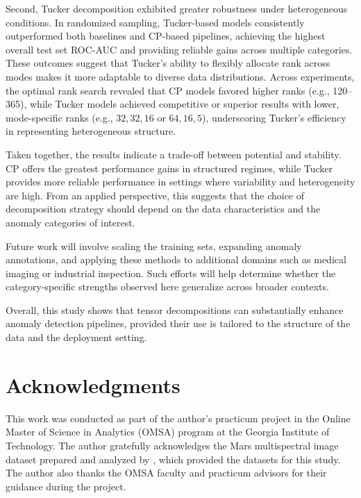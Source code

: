\documentclass[11pt]{article}
\begin{document}
Second, Tucker decomposition exhibited greater robustness under heterogeneous conditions. In randomized sampling, Tucker-based models consistently outperformed both baselines and CP-based pipelines, achieving the highest overall test set ROC-AUC and providing reliable gains across multiple categories. These outcomes suggest that Tucker’s ability to flexibly allocate rank across modes makes it more adaptable to diverse data distributions. Across experiments, the optimal rank search revealed that CP models favored higher ranks (e.g., 120–365), while Tucker models achieved competitive or superior results with lower, mode-specific ranks (e.g., \(32,32,16\) or \(64,16,5\)), underscoring Tucker’s efficiency in representing heterogeneous structure.  

Taken together, the results indicate a trade-off between potential and stability. CP offers the greatest performance gains in structured regimes, while Tucker provides more reliable performance in settings where variability and heterogeneity are high. From an applied perspective, this suggests that the choice of decomposition strategy should depend on the data characteristics and the anomaly categories of interest.  

Future work will involve scaling the training sets, expanding anomaly annotations, and applying these methods to additional domains such as medical imaging or industrial inspection. Such efforts will help determine whether the category-specific strengths observed here generalize across broader contexts.  

Overall, this study shows that tensor decompositions can substantially enhance anomaly detection pipelines, provided their use is tailored to the structure of the data and the deployment setting.


\section*{Acknowledgments}
This work was conducted as part of the author’s practicum project in the Online Master of Science in Analytics (OMSA) program at the Georgia Institute of Technology. The author gratefully acknowledges the Mars multispectral image dataset prepared and analyzed by \citep{Kerner2020}, which provided the datasets for this study. The author also thanks the OMSA faculty and practicum advisors for their guidance during the project.


\printbibliography %
\end{document}
